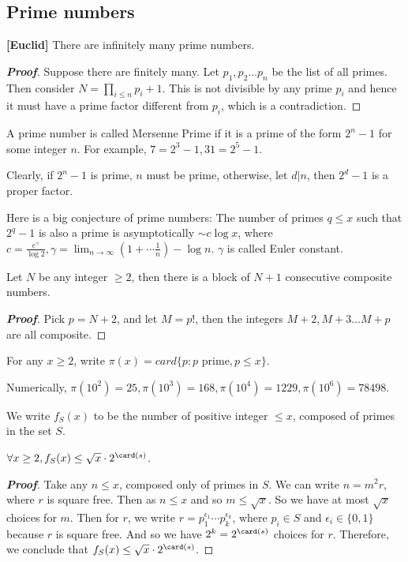 \subsection{Prime numbers}
\begin{theorem}{\bf [Euclid]} There are infinitely many prime numbers.
\end{theorem}
\begin{proof}[\bf Proof] Suppose there are finitely many. Let $p_1, p_2 \ldots p_n$ be the list of all primes. Then consider $N=\prod_{i \le n}p_i +1$. This is not divisible by any prime $p_i$ and hence it must have a prime factor different from $p_i$, which is a contradiction.
\end{proof}
\begin{definition} A prime number is called Mersenne Prime if it is a prime of the form $2^n-1$ for some integer $n$. For example, $7=2^3-1, 31=2^5-1$.
\end{definition}
\begin{remark} Clearly, if $2^n-1$ is prime, $n$ must be prime, otherwise, let $d|n$, then $2^d -1$ is a proper factor.
\end{remark}
Here is a big conjecture of prime numbers: The number of primes $q \le x$ such that $2^q -1$ is also a prime is asymptotically $\sim c \log{x}$, where $c=\frac{e^\gamma}{\log{2}}, \gamma=\lim_{n \to \infty}(1+ \cdots \frac{1}{n})-\log{n}$. $\gamma$ is called Euler constant.
\begin{proposition} Let $N$ be any integer $\ge 2$, then there is a block of $N+1$ consecutive composite numbers.
\end{proposition}
\begin{proof}[\bf Proof] Pick $p = N+2$, and let $M=p!$, then the integers $M+2,M+3 \ldots M+p$ are all composite.
\end{proof}
\begin{definition} For any  $x \ge 2$, write $\pi(x)=card\{p: p \text{ prime}, p \le x\}$.
\end{definition}
Numerically, $\pi(10^2)=25, \pi(10^3)=168, \pi(10^4)=1229, \pi(10^6)=78498$.
\begin{definition} We write $f_S(x)$ to be the number of positive integer $\le x$, composed of primes in the set $S$.
\end{definition}
\begin{proposition} $\forall x \ge 2, f_S(x) \le \sqrt{x} \cdot 2^{\card(s)}$.
\end{proposition}
\begin{proof}[\bf Proof] Take any $n \le x$, composed only of primes in $S$. We can write $n=m^2 r$, where $r$ is square free. Then as $n \le x$ and so $m \le \sqrt{x}$. So we have at most $\sqrt{x}$ choices for $m$. Then for $r$, we write $r=p_1^{\epsilon_1} \cdots p_k^{\epsilon_k}$, where $p_i \in S$ and $\epsilon_i \in \{0,1\}$ because $r$ is square free. And so we have $2^k=2^{\card(s)}$ choices for $r$. Therefore, we conclude that $f_S(x) \le \sqrt{x} \cdot 2^{\card(s)}$.
\end{proof}
